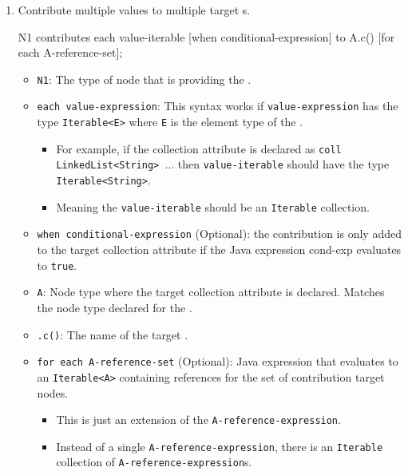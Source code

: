 \begin{definition}[Contribution]
\begin{enumerate}[noitemsep]
  \item Contribute multiple values to multiple target s.
\begin{javasource}
  N1 contributes each value-iterable
    [when conditional-expression]
    to A.c()
    [for each A-reference-set];
\end{javasource}
    \begin{itemize}[noitemsep]
    \item \texttt{N1}: The type of  node that is providing the .
    \item \texttt{each value-expression}: This syntax works if \texttt{value-expression} has the type \texttt{Iterable<E>} where \texttt{E} is the element type of the .
      \begin{itemize}[noitemsep]
      \item For example, if the collection attribute is declared as \texttt{coll LinkedList<String> $\ldots$} then \texttt{value-iterable} should have the type \texttt{Iterable<String>}.
      \item Meaning the \texttt{value-iterable} should be an \texttt{Iterable} collection.
      \end{itemize}
    \item \texttt{when conditional-expression} (Optional): the contribution is only added to the target collection attribute if the Java expression cond-exp evaluates to \texttt{true}.
    \item \texttt{A}: Node type where the target collection attribute is declared. Matches the node type declared for the .
    \item \texttt{.c()}: The name of the target .
    \item \texttt{for each A-reference-set} (Optional): Java expression that evaluates to an \texttt{Iterable<A>} containing references for the set of contribution target nodes.
      \begin{itemize}[noitemsep]
      \item This is just an extension of the \texttt{A-reference-expression}.
      \item Instead of a single \texttt{A-reference-expression}, there is an \texttt{Iterable} collection of \texttt{A-reference-expression}s.
      \end{itemize}
    \end{itemize}
  \end{enumerate}
\end{definition}

